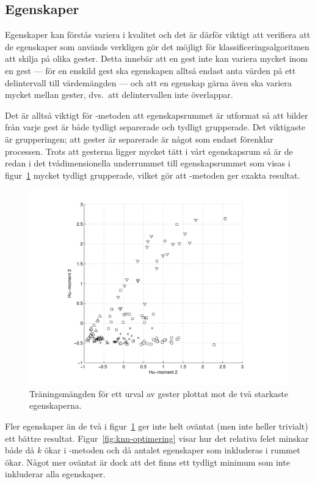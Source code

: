 \documentclass[../rapport_MVEX01-11-05]{subfiles}
\begin{document}
\subsection{Egenskaper}\label{sec:resultat_features}

Egenskaper kan förstås variera i kvalitet och det är därför viktigt att
verifiera att de egenskaper som används verkligen gör det möjligt för
klassificeringsalgoritmen att skilja på olika gester. Detta innebär att en
gest inte kan variera mycket inom en gest --- för en enskild gest ska 
egenskapen alltså endast anta värden på ett delintervall till värdemängden ---
och att en egenskap gärna även ska variera mycket mellan gester, dvs.~att
delintervallen inte överlappar.

Det är alltså viktigt för \knn-metoden att
egenskapsrummet är utformat så att bilder från varje gest är både tydligt
separerade och tydligt grupperade. Det viktigaste är grupperingen; att gester
är separerade är något som endast förenklar processen.
Trots att gesterna ligger mycket tätt i vårt egenskapsrum så är de redan i det
tvådimensionella underrummet till egenskapsrummet som visas i figur~\ref{fig:feats1011}
mycket tydligt grupperade, vilket gör att \knn-metoden ger exakta resultat.

\begin{figure}[tb]
  \centering
  \includegraphics[width=\textwidth,trim=2cm 0.5cm 2cm 0]{bilder/feats-10+11}
  \caption{Träningsmängden för ett urval av gester plottat mot de två starkaste
  egenskaperna.}
  \label{fig:feats1011}
\end{figure}

Fler egenskaper än de två i figur~\ref{fig:feats1011} ger inte helt oväntat
(men inte heller trivialt) ett bättre resultat. Figur~\ref{fig:knn-optimering} visar
hur det relativa felet minskar både då $k$ ökar i \knn-metoden och då antalet
egenskaper som inkluderas i rummet ökar. Något mer oväntat är dock att det
finns ett tydligt minimum som inte inkluderar alla egenskaper.
\end{document}
